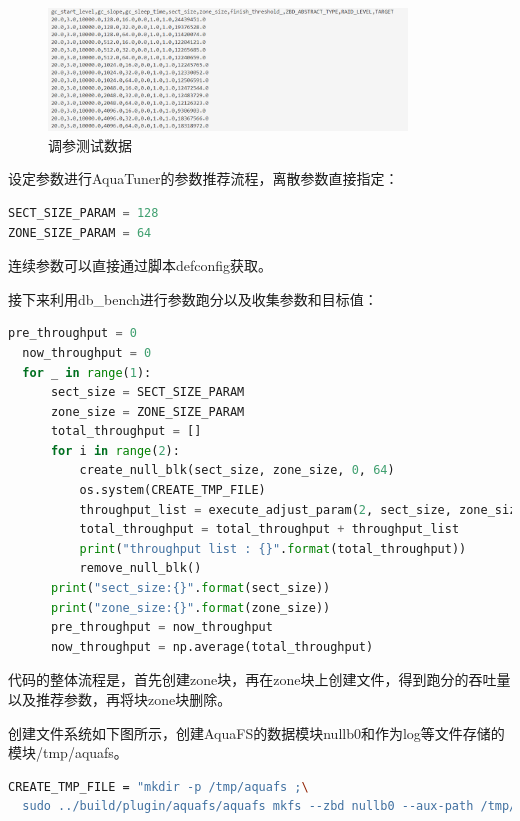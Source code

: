 \begin{figure}[htbp]
  \centering
  \includegraphics[width=0.85\textwidth]{fig/turnner1}
  \caption{ 调参测试数据 }
  \label{test-turnner1}
\end{figure}

设定参数进行AquaTuner的参数推荐流程，离散参数直接指定：

\begin{lstlisting}[language=Python]
SECT_SIZE_PARAM = 128
ZONE_SIZE_PARAM = 64
\end{lstlisting}

连续参数可以直接通过脚本defconfig获取。

接下来利用db\_bench进行参数跑分以及收集参数和目标值：

\begin{lstlisting}[language=Python]
  pre_throughput = 0
  now_throughput = 0
  for _ in range(1):
      sect_size = SECT_SIZE_PARAM
      zone_size = ZONE_SIZE_PARAM
      total_throughput = []
      for i in range(2):
          create_null_blk(sect_size, zone_size, 0, 64)
          os.system(CREATE_TMP_FILE)
          throughput_list = execute_adjust_param(2, sect_size, zone_size)
          total_throughput = total_throughput + throughput_list
          print("throughput list : {}".format(total_throughput))
          remove_null_blk()
      print("sect_size:{}".format(sect_size))
      print("zone_size:{}".format(zone_size))
      pre_throughput = now_throughput
      now_throughput = np.average(total_throughput)
\end{lstlisting}

代码的整体流程是，首先创建zone块，再在zone块上创建文件，得到跑分的吞吐量以及推荐参数，再将块zone块删除。

创建文件系统如下图所示，创建AquaFS的数据模块nullb0和作为log等文件存储的模块/tmp/aquafs。

\begin{lstlisting}[language=bash]
  CREATE_TMP_FILE = "mkdir -p /tmp/aquafs ;\
  sudo ../build/plugin/aquafs/aquafs mkfs --zbd nullb0 --aux-path /tmp/aquafs"
\end{lstlisting}

